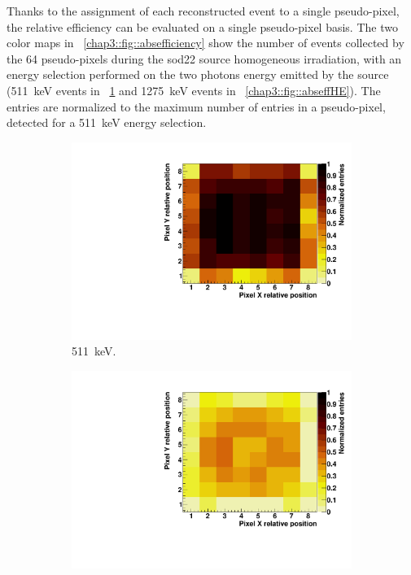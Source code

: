 Thanks to the assignment of each reconstructed event to a single pseudo-pixel, the relative efficiency can be evaluated on a single pseudo-pixel basis. The two color maps in \figurename~\ref{chap3::fig::absefficiency} show the number of events collected by the 64 pseudo-pixels during the \gls{sod22} source homogeneous irradiation, with an energy selection performed on the two photons energy emitted by the source (511~keV events in \figurename~\ref{chap3::fig::abseffLE} and 1275~keV events in \figurename~\ref{chap3::fig::abseffHE}). The entries are normalized to the maximum number of entries in a pseudo-pixel, detected for a 511~keV energy selection.

\begin{figure}
\begin{subfigure}[t]{0.5\textwidth}
\centering
\includegraphics[width=1\textwidth]{03_GraphicFiles/chapter3_CLaRySproto/Absorber/images/eff_map_LE_norm.pdf}
\caption{511~keV.}
\label{chap3::fig::abseffLE}
\end{subfigure}
\begin{subfigure}[t]{0.5\textwidth}
\centering
\includegraphics[width=1\textwidth]{03_GraphicFiles/chapter3_CLaRySproto/Absorber/images/eff_map_HE_norm.pdf}

\end{subfigure}
\end{figure}
